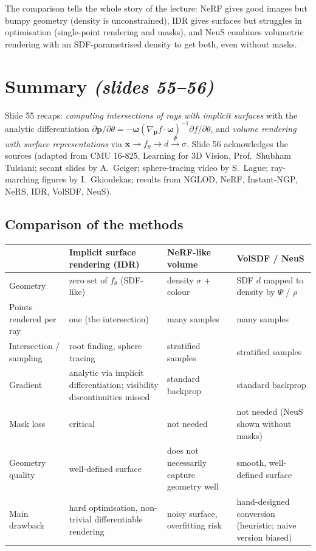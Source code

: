 \documentclass[11pt,a4paper]{article}
\newcommand{\bx}{\bm{x}}
\newcommand{\bp}{{\bm{p}}}
\newcommand{\bom}{{\bm{\omega}}}
\theoremstyle{definition}
\theoremstyle{plain}
\theoremstyle{remark}
\begin{document}
\begin{intuition}
The comparison tells the whole story of the lecture: NeRF gives good images but bumpy geometry (density is unconstrained),
IDR gives surfaces but struggles in optimisation (single-point rendering and masks), and NeuS combines volumetric rendering with
an SDF-parametrised density to get both, even without masks.
\end{intuition}

\section{Summary \emph{(slides 55--56)}}
Slide 55 recaps: \emph{computing intersections of rays with implicit surfaces} with the analytic differentiation
$\partial\bp/\partial\theta=-\bom(\nabla_{\bp} f\cdot\bom)^{-1}\partial f/\partial\theta$, and \emph{volume rendering with surface representations}
via $\bx\to f_\theta\to d\xrightarrow{\Psi}\sigma$. Slide 56 acknowledges the sources (adapted from CMU 16-825, Learning for 3D Vision, Prof.\ Shubham Tulsiani; secant slides by A.~Geiger;
sphere-tracing video by S.~Lague; ray-marching figures by I.~Gkioulekas; results from NGLOD, NeRF, Instant-NGP, NeRS, IDR, VolSDF, NeuS).

\subsection*{Comparison of the methods}
\begin{center}
\small
\renewcommand{\arraystretch}{1.25}
\begin{tabular}{@{}>{\raggedright\arraybackslash}p{2.7cm}>{\raggedright\arraybackslash}p{3.4cm}>{\raggedright\arraybackslash}p{3.3cm}>{\raggedright\arraybackslash}p{3.4cm}@{}}
\toprule
 & \textbf{Implicit surface rendering (IDR)} & \textbf{NeRF-like volume} & \textbf{VolSDF / NeuS}\\
\midrule
Geometry & zero set of $f_\theta$ (SDF-like) & density $\sigma$ + colour & SDF $d$ mapped to density by $\Psi$ / $\rho$\\
Points rendered per ray & one (the intersection) & many samples & many samples\\
Intersection / sampling & root finding, sphere tracing & stratified samples & stratified samples\\
Gradient & analytic via implicit differentiation; visibility discontinuities missed & standard backprop & standard backprop\\
Mask loss & critical & not needed & not needed (NeuS shown without masks)\\
Geometry quality & well-defined surface & does not necessarily capture geometry well & smooth, well-defined surface\\
Main drawback & hard optimisation, non-trivial differentiable rendering & noisy surface, overfitting risk & hand-designed conversion (heuristic; naive version biased)\\
\bottomrule
\end{tabular}
\end{center}
\end{document}
